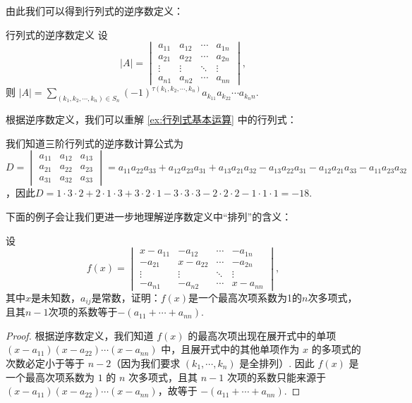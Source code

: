 由此我们可以得到行列式的逆序数定义：

\begin{theorem}{行列式的逆序数定义}{}
    设
    \[|A| = \begin{vmatrix}
            a_{11} & a_{12} & \cdots & a_{1n} \\
            a_{21} & a_{22} & \cdots & a_{2n} \\
            \vdots & \vdots & \ddots & \vdots \\
            a_{n1} & a_{n2} & \cdots & a_{nn}
        \end{vmatrix},\]
    则 $|A| = \sum\limits_{(k_1,k_2,\cdots,k_n) \in S_n} (-1)^{\tau(k_1,k_2,\cdots,k_n)}a_{k_11}a_{k_22}\cdots a_{k_nn}$.
\end{theorem}

根据逆序数定义，我们可以重解 \autoref{ex:行列式基本运算} 中的行列式：
\begin{solution}
    我们知道三阶行列式的逆序数计算公式为 $D=\begin{vmatrix}
        a_{11} & a_{12} & a_{13} \\
        a_{21} & a_{22} & a_{23} \\
        a_{31} & a_{32} & a_{33}
    \end{vmatrix}=a_{11}a_{22}a_{33}+a_{12}a_{23}a_{31}+a_{13}a_{21}a_{32}-a_{13}a_{22}a_{31}-a_{12}a_{21}a_{33}-a_{11}a_{23}a_{32}$，因此$D=1 \cdot 3 \cdot 2+2 \cdot 1 \cdot 3+3 \cdot 2 \cdot 1-3 \cdot 3 \cdot 3-2 \cdot 2 \cdot 2-1 \cdot 1 \cdot 1=-18$.
\end{solution}

下面的例子会让我们更进一步地理解逆序数定义中``排列''的含义：
\begin{example}{}{}
    设
    \[f(x)=\begin{vmatrix}
        x-a_{11} & -a_{12} & \cdots & -a_{1n} \\
        -a_{21} & x-a_{22} & \cdots & -a_{2n} \\
        \vdots & \vdots & \ddots & \vdots \\
        -a_{n1} & -a_{n2} & \cdots & x-a_{nn}
    \end{vmatrix},\]
    其中$x$是未知数，$a_{ij}$是常数，证明：$f(x)$是一个最高次项系数为1的$n$次多项式，且其$n-1$次项的系数等于$-(a_{11}+\cdots+a_{nn})$.
\end{example}

\begin{proof}
    根据逆序数定义，我们知道 $f(x)$ 的最高次项出现在展开式中的单项 $(x-a_{11})(x-a_{22})\cdots(x-a_{nn})$ 中，且展开式中的其他单项作为 $x$ 的多项式的次数必定小于等于 $n-2$（因为我们要求 $(k_1,\cdots,k_n)$ 是全排列）. 因此 $f(x)$ 是一个最高次项系数为 $1$ 的 $n$ 次多项式，且其 $n-1$ 次项的系数只能来源于 $(x-a_{11})(x-a_{22})\cdots(x-a_{nn})$，故等于 $-(a_{11}+\cdots+a_{nn})$.
\end{proof}

